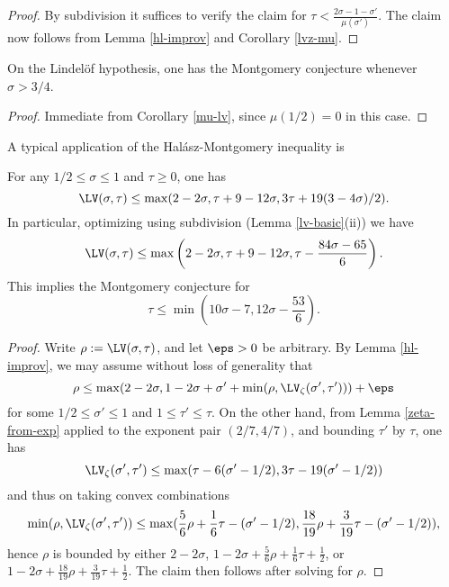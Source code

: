 \begin{proof} By subdivision it suffices to verify the claim for $\tau < \frac{2\sigma-1-\sigma'}{\mu(\sigma')}$.  The claim now follows from Lemma \ref{hl-improv} and Corollary \ref{lvz-mu}.
\end{proof}

\begin{theorem}\label{htlv}\cite[Theorem 1]{halasz_distribution_1969} On the Lindel\"of hypothesis, one has the Montgomery conjecture whenever $\sigma > 3/4$. 
\end{theorem}

\begin{proof}  Immediate from Corollary \ref{mu-lv}, since $\mu(1/2)=0$ in this case.
\end{proof}

A typical application of the Hal\'asz-Montgomery inequality is

\begin{lemma}\label{ivic-lvt}\cite[(11.40)]{ivic}  For any $1/2 \leq \sigma \leq 1$ and $\tau \geq 0$, one has
    $$ \LV(\sigma,\tau) \leq \max( 2-2\sigma, \tau + 9-12\sigma, 3\tau + 19(3-4\sigma)/2).$$
In particular, optimizing using subdivision (Lemma \ref{lv-basic}(ii)) we have
$$ \LV(\sigma,\tau) \leq \max\left( 2-2\sigma, \tau + 9-12\sigma, \tau - \frac{84\sigma-65}{6}\right).$$
This implies the Montgomery conjecture for
$$ \tau \leq \min( 10\sigma-7, 12 \sigma - \frac{53}{6}).$$
\end{lemma}

\begin{proof}  Write $\rho := \LV(\sigma,\tau)$, and let $\eps>0$ be arbitrary. By Lemma \ref{hl-improv}, we may assume without loss of generality that
$$ \rho \leq \max( 2-2\sigma, 1-2\sigma + \sigma' + \min( \rho, \LV_\zeta(\sigma',\tau')) ) + \eps$$
for some $1/2 \leq \sigma' \leq 1$ and $1 \leq \tau' \leq \tau$.  On the other hand, from Lemma \ref{zeta-from-exp} applied to the exponent pair $(2/7,4/7)$, and bounding $\tau'$ by $\tau$, one has
$$ \LV_\zeta(\sigma',\tau') \leq \max( \tau-6(\sigma'-1/2), 3\tau - 19(\sigma'-1/2))$$
and thus on taking convex combinations
$$ \min(\rho,\LV_\zeta(\sigma',\tau')) \leq \max( \frac{5}{6}\rho + \frac{1}{6} \tau - (\sigma'-1/2), \frac{18}{19} \rho + \frac{3}{19} \tau - (\sigma'-1/2) ),$$
hence $\rho$ is bounded by either $2 - 2 \sigma$, $1 - 2\sigma + \frac{5}{6}\rho + \frac{1}{6} \tau + \frac{1}{2}$, or $1-2\sigma + \frac{18}{19} \rho + \frac{3}{19} \tau + \frac{1}{2}$.  The claim then follows after solving for $\rho$.
\end{proof}

    
